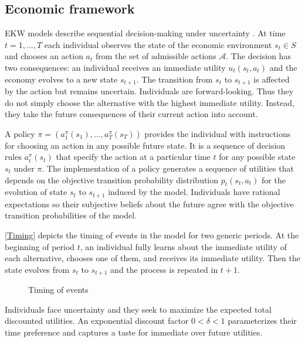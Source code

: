 \subsection{Economic framework}
EKW models describe sequential decision-making under uncertainty \citep{Gilboa.2009, Machina.2014}. At time $t = 1, \hdots, T$ each individual observes the state of the economic environment $s_t\in S$ and chooses an action $a_t$ from the set of admissible actions $\mathcal{A}$. The decision has two consequences: an individual receives an immediate utility $u_t(s_t, a_t)$ and the economy evolves to a new state $s_{t + 1}$. The transition from $s_t$ to $s_{t + 1}$ is affected by the action but remains uncertain. Individuals are forward-looking. Thus they do not simply choose the alternative with the highest immediate utility. Instead, they take the future consequences of their current action into account.

A policy $\pi = (a^\pi_1(s_1), \hdots, a^\pi_T(s_T))$ provides the individual with instructions for choosing an action in any possible future state. It is a sequence of decision rules $a^\pi_t(s_t)$ that specify the action at a particular time $t$ for any possible state $s_t$ under $\pi$. The implementation of a policy generates a sequence of utilities that depends on the objective transition probability distribution $p_t(s_t, a_t)$ for the evolution of state $s_t$ to $s_{t + 1}$ induced by the model. Individuals have rational expectations \citep{Muth.1961} so their subjective beliefs about the future agree with the objective transition probabilities of the model.

\autoref{Timing} depicts the timing of events in the model for two generic periods. At the beginning of period $t$, an individual fully learns about the immediate utility of each alternative, chooses one of them, and receives its immediate utility. Then the state evolves from $s_t$ to $s_{t + 1}$ and the process is repeated in $t + 1$.
%
\begin{figure}[b]
	\centering
	\scalebox{0.755}{}
	\caption{Timing of events}
	\label{Timing}
\end{figure}
%

Individuals face uncertainty and they seek to maximize the expected total discounted utilities. An exponential discount factor ${0 < \delta < 1}$ parameterizes their time preference and captures a taste for immediate over future utilities.

